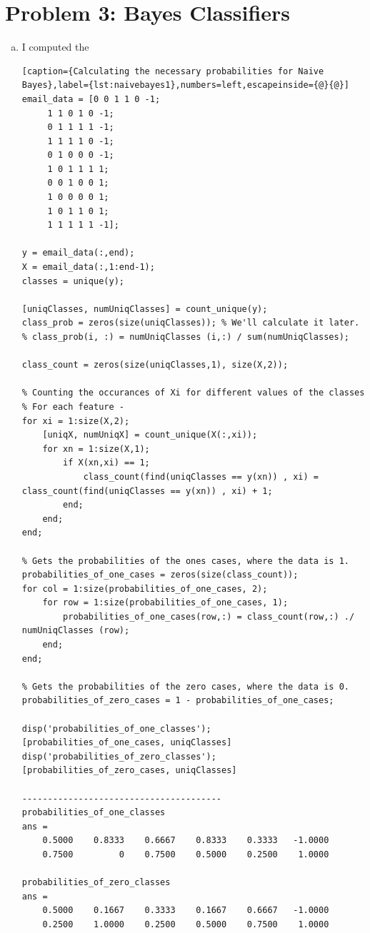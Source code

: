 \documentclass[a4paper, 11pt]{article}
\begin{document}
\section*{Problem 3: Bayes Classifiers}
\begin{enumerate}[(a)]
\item I computed the 
\vspace{-20pt}
\begin{lstlisting}[caption={Calculating the necessary probabilities for Naive Bayes},label={lst:naivebayes1},numbers=left,escapeinside={@}{@}]
email_data = [0 0 1 1 0 -1;
     1 1 0 1 0 -1;
     0 1 1 1 1 -1;
     1 1 1 1 0 -1;
     0 1 0 0 0 -1;
     1 0 1 1 1 1;
     0 0 1 0 0 1;
     1 0 0 0 0 1;
     1 0 1 1 0 1;
     1 1 1 1 1 -1];
 
y = email_data(:,end);
X = email_data(:,1:end-1);
classes = unique(y);

[uniqClasses, numUniqClasses] = count_unique(y);
class_prob = zeros(size(uniqClasses)); % We'll calculate it later.
% class_prob(i, :) = numUniqClasses (i,:) / sum(numUniqClasses);

class_count = zeros(size(uniqClasses,1), size(X,2));

% Counting the occurances of Xi for different values of the classes
% For each feature - 
for xi = 1:size(X,2);
    [uniqX, numUniqX] = count_unique(X(:,xi));
    for xn = 1:size(X,1);
        if X(xn,xi) == 1;
            class_count(find(uniqClasses == y(xn)) , xi) = class_count(find(uniqClasses == y(xn)) , xi) + 1;
        end;
    end;
end;

% Gets the probabilities of the ones cases, where the data is 1.
probabilities_of_one_cases = zeros(size(class_count));
for col = 1:size(probabilities_of_one_cases, 2);
    for row = 1:size(probabilities_of_one_cases, 1);
        probabilities_of_one_cases(row,:) = class_count(row,:) ./ numUniqClasses (row);
    end;
end;

% Gets the probabilities of the zero cases, where the data is 0.
probabilities_of_zero_cases = 1 - probabilities_of_one_cases;

disp('probabilities_of_one_classes');
[probabilities_of_one_cases, uniqClasses]
disp('probabilities_of_zero_classes');
[probabilities_of_zero_cases, uniqClasses]

---------------------------------------
probabilities_of_one_classes
ans =
    0.5000    0.8333    0.6667    0.8333    0.3333   -1.0000
    0.7500         0    0.7500    0.5000    0.2500    1.0000

probabilities_of_zero_classes
ans =
    0.5000    0.1667    0.3333    0.1667    0.6667   -1.0000
    0.2500    1.0000    0.2500    0.5000    0.7500    1.0000
\end{lstlisting}


\end{enumerate}
\end{document}
